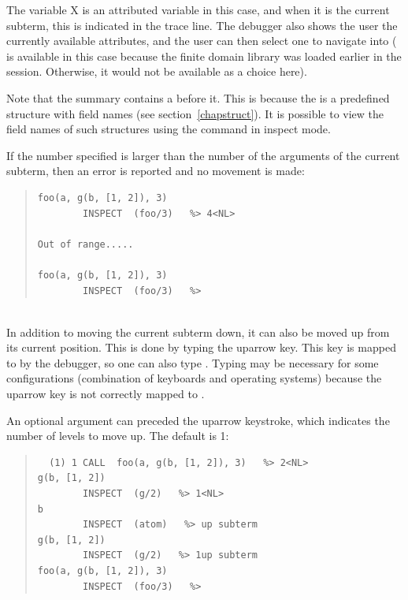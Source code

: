 \begin{descr}{1cm}
The variable X is an attributed variable in this case, and when it is the
current subterm, this is indicated in the trace line. The debugger also
shows the user the currently available attributes, and the user can then
select one to navigate into ( is available in
this case because the finite domain library was loaded earlier in the
session. Otherwise, it would not be available as a choice here).

Note that the  summary contains a  before
it. This is because the  is a predefined structure with
field names (see section~\ref{chapstruct}). It is possible to view the
field names of such structures using the  command in inspect mode.

If the number specified is larger than the number of the arguments of the
current subterm, then an error is reported and no movement is made:

\begin{quote}
\begin{verbatim}
foo(a, g(b, [1, 2]), 3)
        INSPECT  (foo/3)   %> 4<NL>

Out of range.....

foo(a, g(b, [1, 2]), 3)
        INSPECT  (foo/3)   %>
\end{verbatim}
\end{quote}

\\
In addition to moving the current subterm down, it can also be moved up
from its current position. This is done by typing the uparrow key. This key
is mapped to  by the debugger, so one can also type
. Typing  may be necessary for some configurations
(combination of keyboards and operating systems) because the uparrow key is
not correctly mapped to .

An optional argument can preceded the uparrow keystroke, which indicates
the number of levels to move up. The default is 1:

\begin{quote}
\begin{verbatim}
  (1) 1 CALL  foo(a, g(b, [1, 2]), 3)   %> 2<NL>
g(b, [1, 2])
        INSPECT  (g/2)   %> 1<NL>
b
        INSPECT  (atom)   %> up subterm
g(b, [1, 2])
        INSPECT  (g/2)   %> 1up subterm
foo(a, g(b, [1, 2]), 3)
        INSPECT  (foo/3)   %>
\end{verbatim}
\end{quote}


\end{descr}

